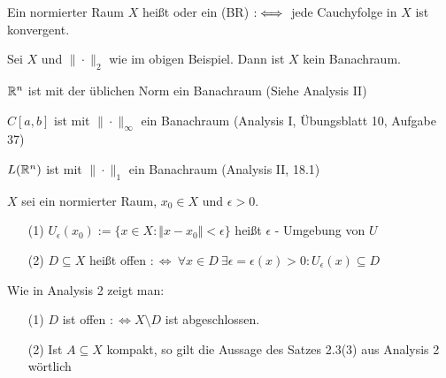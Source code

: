 \documentclass[a4paper,twoside,DIV15,BCOR12mm]{scrbook}
\begin{document}
\begin{definition}
Ein normierter Raum $X$ heißt  oder ein  (BR) $:\iff$ jede Cauchyfolge in $X$ ist konvergent.
\end{definition}

\begin{beispiele}
\item Sei $X$ und $\|\cdot\|_2$ wie im obigen Beispiel. Dann ist $X$ kein Banachraum.
\item $\mathbb{R}^n$ ist mit der üblichen Norm ein Banachraum (Siehe Analysis II)
\item $C[a,b]$ ist mit $\|\cdot\|_\infty$ ein Banachraum (Analysis I, Übungsblatt 10, Aufgabe 37)
\item $L(\mathbb{R}^n)$ ist mit $\|\cdot\|_1$ ein Banachraum (Analysis II, 18.1)
\end{beispiele}

\begin{definition}
$X$ sei ein normierter Raum, $x_0 \in X$ und $\epsilon > 0$.
\begin{itemize}
	\item[(1)] $U_{\epsilon}(x_0) := \{ x \in X: \Vert x - x_0 \Vert < \epsilon \}$ heißt 		
	$\epsilon$ - Umgebung von $U$
	\item[(2)] $D \subseteq X$ heißt offen $: \Leftrightarrow\ \forall x \in D \ \exists \epsilon
	=	\epsilon(x) > 0 : U_{\epsilon} (x) \subseteq D$
\end{itemize}
\end{definition}

Wie in Analysis 2 zeigt man:

\begin{satz}
\begin{itemize}
	\item[(1)] $D$ ist offen $: \Leftrightarrow X \setminus D$ ist abgeschlossen.
	\item[(2)] Ist $A \subseteq X$ kompakt, so gilt die Aussage des Satzes 2.3(3) aus Analysis 2 
	wörtlich
\end{itemize}
\end{satz}
\end{document}
